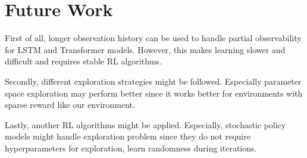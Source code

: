 \section{Future Work}

First of all, longer observation history can be used to handle partial observability for LSTM and Transformer models. However, this makes learning slower and difficult and requires stable RL algorithms. 

Secondly, different exploration strategies might be followed. Especially parameter space exploration \cite{plappert_parameter_2018} may perform better since it works better for environments with sparse reward like our environment.

Lastly, another RL algorithms might be applied. Especially, stochastic policy models might handle exploration problem since they do not require hyperparameters for exploration, learn randomness during iterations.